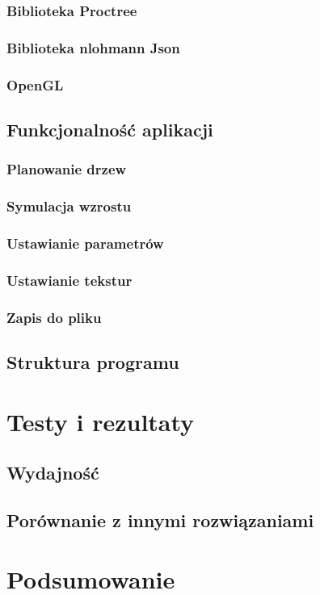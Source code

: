 \documentclass[a4paper,12pt,oneside]{book} %
\begin{document}
\subsection{Biblioteka Proctree}

\subsection{Biblioteka nlohmann Json}

\subsection{OpenGL}

\section{Funkcjonalność aplikacji}

\subsection{Planowanie drzew}

\subsection{Symulacja wzrostu}

\subsection{Ustawianie parametrów}

\subsection{Ustawianie tekstur}

\subsection{Zapis do pliku}

\section{Struktura programu}

\chapter{Testy i rezultaty}

\section{Wydajność}
\section{Porównanie z innymi rozwiązaniami}

\chapter{Podsumowanie}




\end{document}
